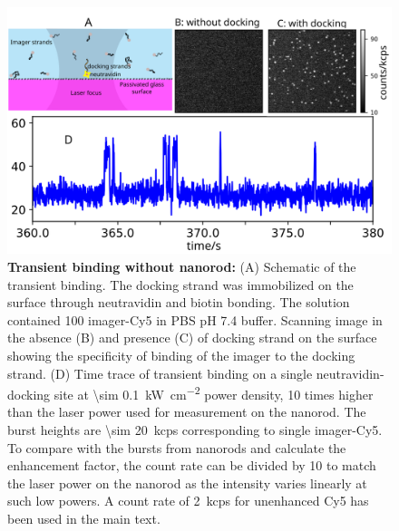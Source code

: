 \begin{figure}[ht]
  \centering
  \includegraphics[width=\textwidth]{timetrace_only_Cy5}
  \makeatletter
  \renewcommand{\fnum@figure}{\figurename~S\thefigure}
  \makeatother
  \caption{\textbf{Transient binding without nanorod:} (A) Schematic of the transient binding.
  The docking strand was immobilized on the surface through neutravidin and biotin bonding.
  The solution contained \SI{100}{\nM} imager-Cy5 in PBS pH 7.4 buffer.
  Scanning image  in the absence (B) and presence (C) of docking strand on the surface showing the specificity of binding of the imager to the docking strand.
  (D) Time trace of transient binding on a single neutravidin-docking site at \SI{\sim 0.1}{\kW\per\cm\squared} power density, 10 times higher than the laser power used for measurement on the nanorod. The burst heights are \SI{\sim 20}{ kcps} corresponding to single imager-Cy5.
  To compare with the bursts from nanorods and calculate the enhancement factor, the count rate can be divided by 10 to match the laser power on the nanorod as the intensity varies linearly at such low powers.
  A count rate of \SI{2}{ kcps} for unenhanced Cy5 has been used in the main text. 
  }
  \label{SIfig:timetrace_only_Cy5}
\end{figure}
